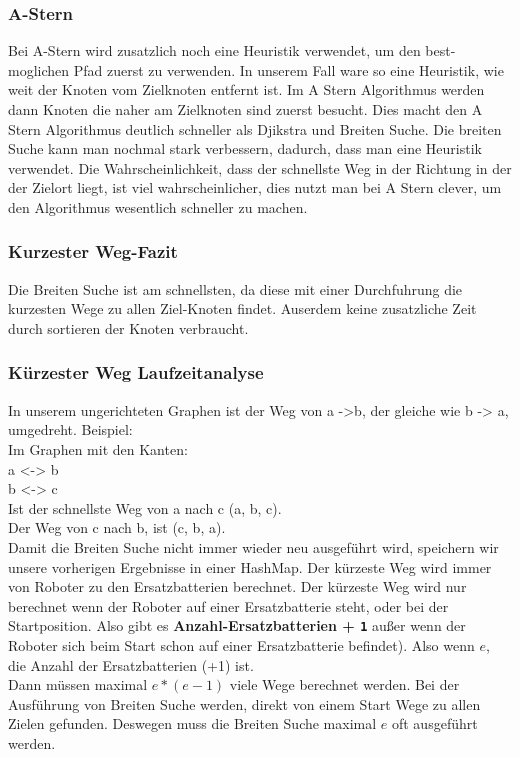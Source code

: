 \documentclass[a4paper,12pt,arial]{scrartcl}
\begin{document}
\subsubsection{A-Stern}
Bei A-Stern wird zusatzlich noch eine Heuristik verwendet, um den best-moglichen Pfad zuerst zu verwenden.
In unserem Fall ware so eine Heuristik, wie weit der Knoten vom Zielknoten entfernt ist. 
Im A Stern Algorithmus werden dann Knoten die naher am Zielknoten sind zuerst besucht.
Dies macht den A Stern Algorithmus deutlich schneller als Djikstra und Breiten Suche.
Die breiten Suche kann man nochmal stark verbessern, dadurch, dass man eine Heuristik verwendet.
Die Wahrscheinlichkeit, dass der schnellste Weg in der Richtung in der der Zielort liegt, ist viel wahrscheinlicher, dies nutzt man bei A Stern clever, um den Algorithmus wesentlich schneller zu machen.

\subsubsection{Kurzester Weg-Fazit}


Die Breiten Suche ist am schnellsten, da diese mit einer Durchfuhrung die kurzesten Wege zu allen Ziel-Knoten findet. Auserdem keine zusatzliche Zeit durch sortieren der Knoten verbraucht.



\par

\subsubsection{Kürzester Weg Laufzeitanalyse}
In unserem ungerichteten Graphen ist der Weg von a ->b, der gleiche wie b -> a, umgedreht.
Beispiel: \\
Im Graphen mit den Kanten:\\
a <-> b \\
b <-> c\\
Ist der schnellste Weg von a nach c (a, b, c). \\
Der Weg von c nach b, ist (c, b, a). \\
Damit die Breiten Suche nicht immer wieder neu ausgeführt wird, speichern wir unsere vorherigen Ergebnisse in einer HashMap. 
Der kürzeste Weg wird immer von Roboter zu den Ersatzbatterien berechnet. Der kürzeste Weg wird nur berechnet wenn der Roboter auf einer Ersatzbatterie steht, oder bei der Startposition.
Also gibt es  \textbf{Anzahl-Ersatzbatterien + \texttt{1}} außer wenn der Roboter sich beim Start schon auf einer Ersatzbatterie befindet).
Also wenn $e$, die Anzahl der Ersatzbatterien (+1) ist. \\
Dann müssen maximal $e * (e-1)$ viele Wege berechnet werden.
Bei der Ausführung von Breiten Suche werden, direkt von einem Start Wege zu allen Zielen gefunden.
Deswegen muss die Breiten Suche maximal $e$ oft ausgeführt werden.
\end{document}
